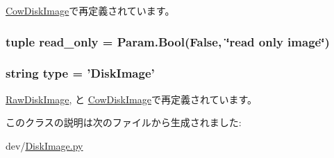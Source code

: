 \hyperlink{classDiskImage_1_1CowDiskImage_a0ee2b1c488c3337173db75b5d28a1f63}{CowDiskImage}で再定義されています。\hypertarget{classDiskImage_1_1DiskImage_a4a42c250e4afec93e064bf70b6e6ee73}{
\subsubsection[{read\_\-only}]{\setlength{\rightskip}{0pt plus 5cm}tuple {\bf read\_\-only} = Param.Bool(False, \char`\"{}read only image\char`\"{})}}
\label{classDiskImage_1_1DiskImage_a4a42c250e4afec93e064bf70b6e6ee73}
\hypertarget{classDiskImage_1_1DiskImage_acce15679d830831b0bbe8ebc2a60b2ca}{
\subsubsection[{type}]{\setlength{\rightskip}{0pt plus 5cm}string {\bf type} = '{\bf DiskImage}'}}
\label{classDiskImage_1_1DiskImage_acce15679d830831b0bbe8ebc2a60b2ca}


\hyperlink{classDiskImage_1_1RawDiskImage_acce15679d830831b0bbe8ebc2a60b2ca}{RawDiskImage}, と \hyperlink{classDiskImage_1_1CowDiskImage_acce15679d830831b0bbe8ebc2a60b2ca}{CowDiskImage}で再定義されています。

このクラスの説明は次のファイルから生成されました:\begin{DoxyCompactItemize}
\item 
dev/\hyperlink{DiskImage_8py}{DiskImage.py}\end{DoxyCompactItemize}
